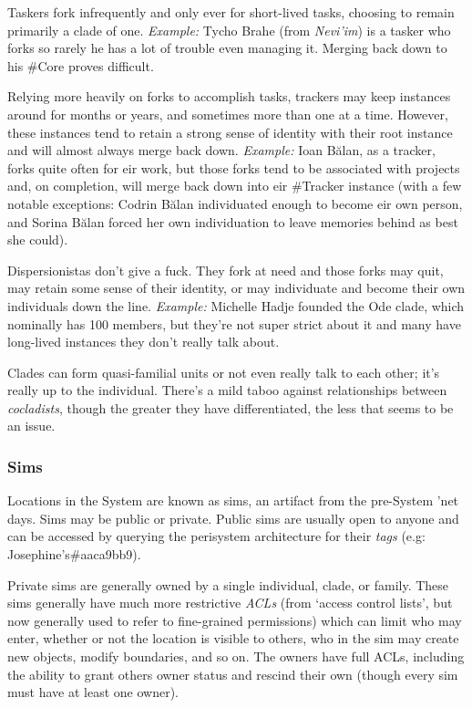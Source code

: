\begin{description}
\tightlist
\item[Taskers]
Taskers fork infrequently and only ever for short-lived tasks, choosing to remain primarily a clade of one. \emph{Example:} Tycho Brahe (from \emph{Nevi'im}) is a tasker who forks so rarely he has a lot of trouble even managing it. Merging back down to his \#Core proves difficult.
\item[Trackers]
Relying more heavily on forks to accomplish tasks, trackers may keep instances around for months or years, and sometimes more than one at a time. However, these instances tend to retain a strong sense of identity with their root instance and will almost always merge back down. \emph{Example:} Ioan Bălan, as a tracker, forks quite often for eir work, but those forks tend to be associated with projects and, on completion, will merge back down into eir \#Tracker instance (with a few notable exceptions: Codrin Bălan individuated enough to become eir own person, and Sorina Bălan forced her own individuation to leave memories behind as best she could).
\item[Dispersionistas]
Dispersionistas don't give a fuck. They fork at need and those forks may quit, may retain some sense of their identity, or may individuate and become their own individuals down the line. \emph{Example:} Michelle Hadje founded the Ode clade, which nominally has 100 members, but they're not super strict about it and many have long-lived instances they don't really talk about.
\end{description}

Clades can form quasi-familial units or not even really talk to each other; it's really up to the individual. There's a mild taboo against relationships between \emph{cocladists}, though the greater they have differentiated, the less that seems to be an issue.

\subsubsection{Sims}

Locations in the System are known as sims, an artifact from the pre-System 'net days. Sims may be public or private. Public sims are usually open to anyone and can be accessed by querying the perisystem architecture for their \emph{tags} (e.g: Josephine's\#aaca9bb9).

Private sims are generally owned by a single individual, clade, or family. These sims generally have much more restrictive \emph{ACLs} (from `access control lists', but now generally used to refer to fine-grained permissions) which can limit who may enter, whether or not the location is visible to others, who in the sim may create new objects, modify boundaries, and so on. The owners have full ACLs, including the ability to grant others owner status and rescind their own (though every sim must have at least one owner).

